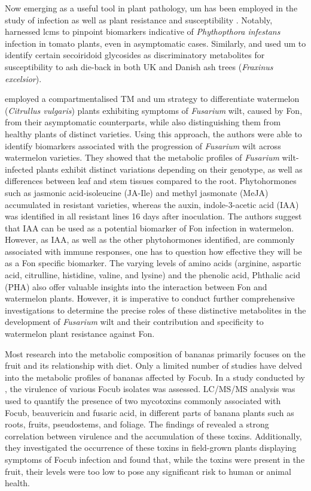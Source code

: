 Now emerging as a useful tool in plant pathology, \ac{um} has been employed in the study of infection as well as plant resistance and susceptibility \parencite{Allwood2021}. Notably, \textcite{Garcia2018} harnessed \acf{lcms} to pinpoint biomarkers indicative of \textit{Phythopthora infestans} infection in tomato plants, even in asymptomatic cases. Similarly, \textcite{Sambles2017} and \textcite{Sidda2020} used \ac{um} to identify certain secoiridoid glycosides as discriminatory metabolites for susceptibility to ash die-back in both UK and Danish ash trees (\textit{Fraxinus excelsior}).

\textcite{Kasote2020} employed a compartmentalised TM and \ac{um} strategy to differentiate watermelon (\textit{Citrullus vulgaris}) plants exhibiting symptoms of \textit{Fusarium} wilt, caused by \acf{Fon}, from their asymptomatic counterparts, while also distinguishing them from healthy plants of distinct varieties. Using this approach, the authors were able to identify biomarkers associated with the progression of \textit{Fusarium} wilt across watermelon varieties. They showed that the metabolic profiles of \textit{Fusarium} wilt-infected plants exhibit distinct variations depending on their genotype, as well as differences between leaf and stem tissues compared to the root. Phytohormones such as jasmonic acid-isoleucine (JA-Ile) and methyl jasmonate (MeJA) accumulated in resistant varieties, whereas the auxin, indole-3-acetic acid (IAA) was identified in all resistant lines 16 days after inoculation. The authors suggest that IAA can be used as a potential biomarker of \ac{Fon} infection in watermelon. However, as IAA, as well as the other phytohormones identified, are commonly associated with immune responses, one has to question how effective they will be as a \ac{Fon} specific biomarker. The varying levels of amino acids (arginine, aspartic acid, citrulline, histidine, valine, and lysine) and the phenolic acid, Phthalic acid (PHA) also offer valuable insights into the interaction between \ac{Fon} and watermelon plants. However, it is imperative to conduct further comprehensive investigations to determine the precise roles of these distinctive metabolites in the development of \textit{Fusarium} wilt and their contribution and specificity to watermelon plant resistance against \ac{Fon}.

Most research into the metabolic composition of bananas primarily focuses on the fruit and its relationship with diet. Only a limited number of studies have delved into the metabolic profiles of bananas affected by \ac{Focub}. In a study conducted by \textcite{Li2013c}, the virulence of various \ac{Focub} isolates was assessed. LC/MS/MS analysis was used to quantify the presence of two mycotoxins commonly associated with \ac{Focub}, beauvericin and fusaric acid, in different parts of banana plants such as roots, fruits, pseudostems, and foliage. The findings of \textcite{Li2013c} revealed a strong correlation between virulence and the accumulation of these toxins. Additionally, they investigated the occurrence of these toxins in field-grown plants displaying symptoms of \ac{Focub} infection and found that, while the toxins were present in the fruit, their levels were too low to pose any significant risk to human or animal health.

